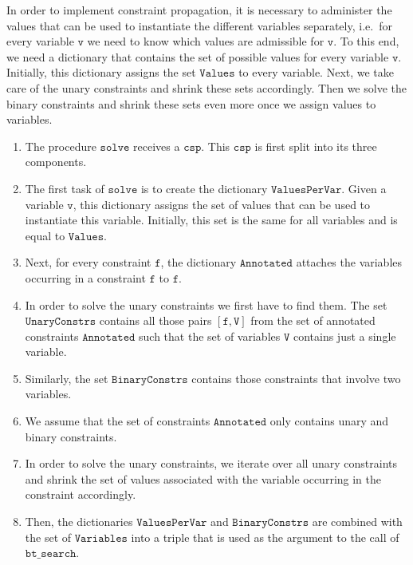 In order to implement constraint propagation, it is necessary to administer the values that can be used
to instantiate the different variables separately, i.e.~for every variable $\mathtt{v}$ we need to know which
values are admissible for $\mathtt{v}$.  To this end, we need a dictionary that contains the set of possible
values for every variable $\mathtt{v}$.  Initially, this dictionary assigns the set $\mathtt{Values}$ to
every variable.  Next, we take care of the unary constraints and shrink these sets accordingly.  Then we solve
the binary constraints and shrink these sets even more once we assign values to variables.
\begin{enumerate}
\item The procedure $\mathtt{solve}$ receives a $\mathtt{csp}$.  This $\mathtt{csp}$ is first split into its three components.
\item The first task of $\mathtt{solve}$ is to create the dictionary $\mathtt{ValuesPerVar}$.  
      Given a variable $\mathtt{v}$, this dictionary assigns the set of values that can be used to instantiate this
      variable.  Initially, this set is the same for all variables and is equal to $\mathtt{Values}$.
\item Next, for every constraint $\mathtt{f}$, the dictionary $\mathtt{Annotated}$ attaches the
      variables occurring in a constraint $\mathtt{f}$ to $\mathtt{f}$.
\item In order to solve the unary constraints we first have to find them.
      The set $\mathtt{UnaryConstrs}$ contains all those pairs $[\mathtt{f}, \mathtt{V}]$ from the set of
      annotated constraints $\mathtt{Annotated}$ such that the set of variables $\mathtt{V}$ contains just a
      single variable. 
\item Similarly, the set $\mathtt{BinaryConstrs}$ contains those constraints that involve two variables.
\item We assume that the set of constraints $\mathtt{Annotated}$ only contains unary and binary constraints.
\item In order to solve the unary constraints, we iterate over all unary constraints and shrink the set of
      values associated with the variable occurring in the constraint accordingly.
\item Then, the dictionaries $\mathtt{ValuesPerVar}$ and $\mathtt{BinaryConstrs}$ are combined with the set
      of $\mathtt{Variables}$ into a triple that is used as the argument to the call of $\mathtt{bt\_search}$.
\end{enumerate}

